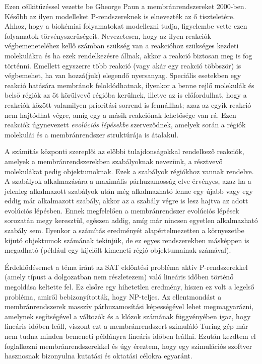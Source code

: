 Ezen célkitűzéssel vezette be Gheorge Paun a membránrendszereket 2000-ben. Később az ilyen modelleket P-rendszereknek is elnevezték az ő tiszteletére. Ahhoz, hogy a biokémiai folyamatokat modellezni tudja, figyelembe vette ezen folyamatok törvényszerűségeit. Nevezetesen, hogy az ilyen reakciók végbemeneteléhez kellő számban szükség van a reakcióhoz szükséges kezdeti molekulákra és ha ezek rendelkezésre állnak, akkor a reakció biztosan meg is fog történni. Emellett egyszerre több reakció (vagy akár egy reakció többször) is végbemehet, ha van hozzá(juk) elegendő nyersanyag. Speciális esetekben egy reakció hatására membránok feloldódhatnak, ilyenkor a benne rejlő molekulák és belső régiók az őt körülvevő régióba kerülnek, illetve az is előfordulhat, hogy a reakciók között valamilyen prioritási sorrend is fennállhat; azaz az egyik reakció nem hajtódhat végre, amíg egy a másik reakciónak lehetősége van rá. Ezen reakciók úgynevezett \textit{evolúciós lépésekbe} szerveződnek, amelyek során a régiók molekulái és a membránrendszer struktúrája is átalakul.

A számítás központi szereplői az előbbi tulajdonságokkal rendelkező reakciók, amelyek a membránrendszerekben szabályoknak nevezünk, a résztvevő molekulákat pedig objektumoknak. Ezek a szabályok régiókhoz vannak rendelve. A szabályok alkalmazására a maximális párhuzamosság elve érvényes, azaz ha a jelenleg alkalmazott szabályok után még alkalmazható lenne egy újabb vagy egy eddig már alkalmazott szabály, akkor az a szabály végre is lesz hajtva az adott evolúciós lépésben. Ennek megfelelően a membránrendszer evolúciós lépések sorozatán megy keresztül, egészen addig, amíg már nincsen egyetlen alkalmazható szabály sem. Ilyenkor a számítás eredményét alapértelmezetten a környezetbe kijutó objektumok számának tekinjük, de ez egyes rendszerekben másképpen is megadható (például egy kijelölt kimeneti régió objektumainak számával).

Érdeklődésemet a téma iránt az SAT eldöntési probléma aktív P-rendszerekkel (amely típust a dolgozatban nem részletezem) való lineáris időben történő megoldása keltette fel. Ez elsőre egy hihetetlen eredmény, hiszen ez volt a legelső probléma, amiről bebizonyították, hogy NP-teljes. Az ellentmondást a membránrendszerek masszív párhuzamosítási képességével lehet megmagyarázni, amelynek segítségével a változók és a klózok számának függvényében igaz, hogy lineáris időben leáll, viszont ezt a membránrendszert szimuláló Turing gép már nem tudna minden bemeneti példányra lineáris időben leállni. Ezután kezdtem el foglalkozni membránrendszerekkel és úgy éreztem, hogy egy szimulációs szoftver hasznosnak bizonyulna kutatási és oktatási célokra egyaránt.

